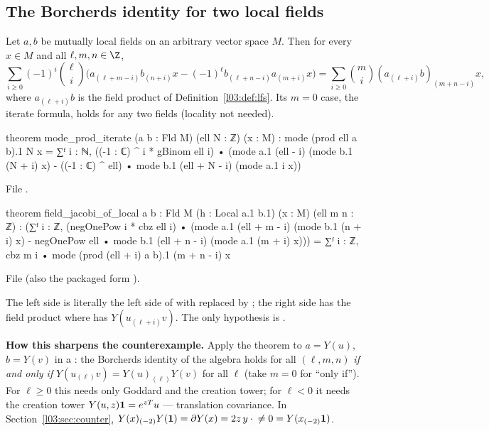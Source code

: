 \subsection{The Borcherds identity for two local fields}

\begin{theorem}\label{l03:thm:fieldjacobi}
Let $a,b$ be mutually local fields on an arbitrary vector space $M$. Then for every $x\in M$ and all
$\ell,m,n\in\Z$,
\begin{equation*}
\sum_{i\ge0}(-1)^i\binom\ell i\Big(a_{(\ell+m-i)}b_{(n+i)}x - (-1)^\ell b_{(\ell+n-i)}a_{(m+i)}x\Big)
= \sum_{i\ge0}\binom mi(a_{(\ell+i)}b)_{(m+n-i)}x,
\end{equation*}
where $a_{(\ell+i)}b$ is the field product of Definition~\ref{l03:def:lfs}. Its $m = 0$ case, the iterate
formula, holds for any two fields (locality not needed).
\end{theorem}
\begin{leancode}
theorem mode_prod_iterate (a b : Fld M) (ell N : ℤ) (x : M) :
    mode (prod ell a b).1 N x =
      ∑ᶠ i : ℕ, ((-1 : ℂ) ^ i * gBinom ell i) •
        (mode a.1 (ell - i) (mode b.1 (N + i) x)
          - ((-1 : ℂ) ^ ell) • mode b.1 (ell + N - i) (mode a.1 i x))
\end{leancode}
File .
\begin{leancode}
theorem field_jacobi_of_local {a b : Fld M} (h : Local a.1 b.1)
    (x : M) (ell m n : ℤ) :
    (∑ᶠ i : ℤ, (negOnePow i * cbz ell i) •
      (mode a.1 (ell + m - i) (mode b.1 (n + i) x) -
        negOnePow ell • mode b.1 (ell + n - i) (mode a.1 (m + i) x))) =
      ∑ᶠ i : ℤ, cbz m i • mode (prod (ell + i) a b).1 (m + n - i) x
\end{leancode}
File  (also the packaged form
).

\begin{dictionary}
The left side is literally the left side of  with 
replaced by ; the right side has the field product  where
 has $Y(u_{(\ell+i)}v)$. The only hypothesis is .

\textbf{How this sharpens the counterexample.} Apply the theorem to $a = Y(u)$, $b = Y(v)$ in a
: the Borcherds identity of the algebra holds for all $(\ell,m,n)$ \emph{if and only
if} $Y(u_{(\ell)}v) = Y(u)_{(\ell)}Y(v)$ for all $\ell$ (take $m = 0$ for ``only if''). For $\ell\ge0$ this
needs only Goddard and the creation tower; for $\ell<0$ it needs the creation tower $Y(u,z)\mathbf{1} =
e^{zT}u$ --- translation covariance. In Section~\ref{l03:sec:counter}, $Y(x)_{(-2)}Y(\mathbf{1}) = \partial
Y(x) = 2z\,y\cdot{}\ne0 = Y(x_{(-2)}\mathbf{1})$.
\end{dictionary}

